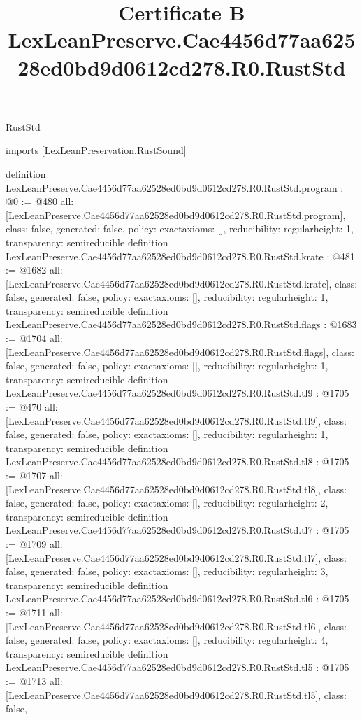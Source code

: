\begin{lexlean}{RustStd}
\title{Certificate B LexLeanPreserve.Cae4456d77aa62528ed0bd9d0612cd278.R0.RustStd}
\begin{coremodule}
imports [LexLeanPreservation.RustSound]

definition LexLeanPreserve.Cae4456d77aa62528ed0bd9d0612cd278.R0.RustStd.program : @0 := @480 {
  all: [LexLeanPreserve.Cae4456d77aa62528ed0bd9d0612cd278.R0.RustStd.program],
  class: false,
  generated: false,
  policy: exact{axioms: []},
  reducibility: regular{height: 1},
  transparency: semireducible
}
definition LexLeanPreserve.Cae4456d77aa62528ed0bd9d0612cd278.R0.RustStd.krate : @481 := @1682 {
  all: [LexLeanPreserve.Cae4456d77aa62528ed0bd9d0612cd278.R0.RustStd.krate],
  class: false,
  generated: false,
  policy: exact{axioms: []},
  reducibility: regular{height: 1},
  transparency: semireducible
}
definition LexLeanPreserve.Cae4456d77aa62528ed0bd9d0612cd278.R0.RustStd.flags : @1683 := @1704 {
  all: [LexLeanPreserve.Cae4456d77aa62528ed0bd9d0612cd278.R0.RustStd.flags],
  class: false,
  generated: false,
  policy: exact{axioms: []},
  reducibility: regular{height: 1},
  transparency: semireducible
}
definition LexLeanPreserve.Cae4456d77aa62528ed0bd9d0612cd278.R0.RustStd.tl9 : @1705 := @470 {
  all: [LexLeanPreserve.Cae4456d77aa62528ed0bd9d0612cd278.R0.RustStd.tl9],
  class: false,
  generated: false,
  policy: exact{axioms: []},
  reducibility: regular{height: 1},
  transparency: semireducible
}
definition LexLeanPreserve.Cae4456d77aa62528ed0bd9d0612cd278.R0.RustStd.tl8 : @1705 := @1707 {
  all: [LexLeanPreserve.Cae4456d77aa62528ed0bd9d0612cd278.R0.RustStd.tl8],
  class: false,
  generated: false,
  policy: exact{axioms: []},
  reducibility: regular{height: 2},
  transparency: semireducible
}
definition LexLeanPreserve.Cae4456d77aa62528ed0bd9d0612cd278.R0.RustStd.tl7 : @1705 := @1709 {
  all: [LexLeanPreserve.Cae4456d77aa62528ed0bd9d0612cd278.R0.RustStd.tl7],
  class: false,
  generated: false,
  policy: exact{axioms: []},
  reducibility: regular{height: 3},
  transparency: semireducible
}
definition LexLeanPreserve.Cae4456d77aa62528ed0bd9d0612cd278.R0.RustStd.tl6 : @1705 := @1711 {
  all: [LexLeanPreserve.Cae4456d77aa62528ed0bd9d0612cd278.R0.RustStd.tl6],
  class: false,
  generated: false,
  policy: exact{axioms: []},
  reducibility: regular{height: 4},
  transparency: semireducible
}
definition LexLeanPreserve.Cae4456d77aa62528ed0bd9d0612cd278.R0.RustStd.tl5 : @1705 := @1713 {
  all: [LexLeanPreserve.Cae4456d77aa62528ed0bd9d0612cd278.R0.RustStd.tl5],
  class: false,
}
\end{coremodule}
\end{lexlean}
